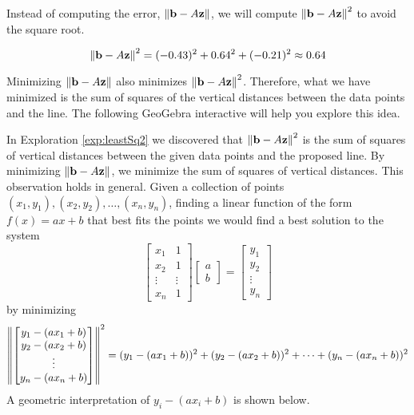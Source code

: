 \documentclass{ximera}
\begin{document}
\begin{exploration}
Instead of computing the error, $\left\lVert\mathbf{b}-A\mathbf{z}\right\rVert$, we will compute $\left\lVert\mathbf{b}-A\mathbf{z}\right\rVert^2$ to avoid the square root.

\begin{equation}
    \left\lVert\mathbf{b}-A\mathbf{z}\right\rVert^2=(-0.43)^2+0.64^2+(-0.21)^2\approx 0.64
\end{equation}

Minimizing $\left\lVert\mathbf{b}-A\mathbf{z}\right\rVert$ also minimizes $\left\lVert\mathbf{b}-A\mathbf{z}\right\rVert^2$.  Therefore, what we have minimized is the sum of squares of the vertical distances between the data points and the line.
The following GeoGebra interactive will help you explore this idea.

\begin{onlineOnly}
\begin{center}
\end{center}
\end{onlineOnly}
\end{exploration}


In Exploration \ref{exp:leastSq2} we discovered that $\left\lVert\mathbf{b}-A\mathbf{z}\right\rVert^2$ is the sum of squares of vertical distances between the given data points and the proposed line.  By minimizing $\left\lVert\mathbf{b}-A\mathbf{z}\right\rVert$, we minimize the sum of squares of vertical distances.  This observation holds in general.  Given a collection of points $(x_1, y_1), (x_2, y_2),\dots ,(x_n, y_n)$, finding a linear function of the form $f(x)=ax+b$ that best fits the points we would find a best solution to the system
$$\begin{bmatrix}x_1&1\\x_2&1\\\vdots&\vdots\\x_n&1\end{bmatrix}\begin{bmatrix}a\\b\end{bmatrix}=\begin{bmatrix}y_1\\y_2\\\vdots\\y_n\end{bmatrix}$$
by minimizing
$$\left\lVert\begin{bmatrix}y_1-(ax_1+b)\\y_2-(ax_2+b)\\\vdots\\y_n-(ax_n+b)\end{bmatrix}\right\rVert^2=(y_1-(ax_1+b))^2+(y_2-(ax_2+b))^2+\dots +(y_n-(ax_n+b))^2$$
A geometric interpretation of $y_i-(ax_i+b)$ is shown below.
\end{document}

